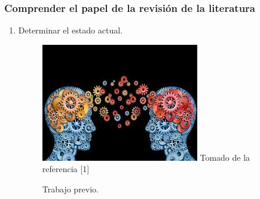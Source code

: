 \documentclass{beamer}
\begin{document}
    \begin{frame}
        \frametitle{Comprender el papel de la revisi\'on de la literatura} 
        \begin{multicols}{2}
          
                \begin{enumerate}
                    \item Determinar el estado actual.
                        \begin{figure}
                            \includegraphics[scale=0.50]{figures/prework}
                            \newline
                            {\tiny Tomado de la referencia [1] }
                            \caption{ Trabajo previo. }
                        \end{figure}
            

\end{enumerate}
\end{multicols}
\end{frame}
\end{document}

